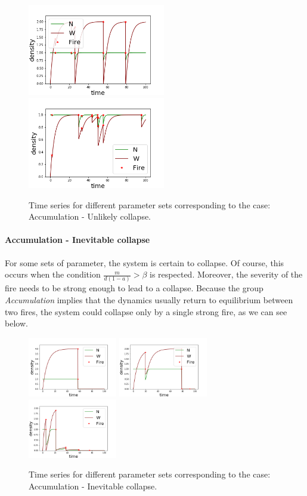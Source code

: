 \documentclass{article}
\begin{document}
\begin{figure}[h!]
\centering
\includegraphics[width=6cm]{return_never_1.png}
\includegraphics[width=6cm]{return_never_2.png}
\caption{Time series for different parameter sets corresponding to the case: Accumulation - Unlikely collapse.}
\label{fig:caseauc}
\end{figure}

\paragraph{Accumulation - Inevitable collapse\\} %
For some sets of parameter, the system is certain to collapse. Of course, this occurs when the condition $\frac{m}{d( 1-a)} > \beta$ is respected. Moreover, the severity of the fire needs to be strong enough to lead to a collapse. Because the group \textit{Accumulation} implies that the dynamics usually return to equilibrium between two fires, the system could collapse only by a single strong fire, as we can see below.

\begin{figure}[h!]
\centering
\includegraphics[width=3.9cm]{return_always_1.png}
\includegraphics[width=3.9cm]{return_always_2.png}
\includegraphics[width=3.9cm]{return_always_3.png}
\caption{Time series for different parameter sets corresponding to the case: Accumulation - Inevitable collapse.}
\end{figure}
\end{document}
